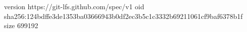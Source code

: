 version https://git-lfs.github.com/spec/v1
oid sha256:124bdffe3de1353ba03666943b0df2ec3b5c1c3332b69211061cf9baf6378b1f
size 699192
